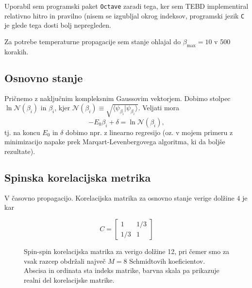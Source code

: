 \documentclass[12pt, a4 paper]{article}
\begin{document}
Uporabil sem programski paket \texttt{Octave} zaradi tega, ker sem TEBD implementiral relativno hitro in pravilno (nisem
se izgubljal okrog indeksov, programski jezik \texttt{C} je glede tega dosti bolj nepregleden.

Za potrebe temperaturne propagacije sem stanje ohlajal do $\beta_\text{max} = 10$ v 500 korakih.

\subsection{Osnovno stanje}

Pri\v cnemo z naklju\v cnim kompleksnim Gaussovim vektorjem. Dobimo stolpec $\ln\mathcal{N}(\beta_i)$ in $\beta_i$, kjer
$\mathcal{N}(\beta_i) \equiv \sqrt{\langle\psi_{\beta_i}|\psi_{\beta_i}\rangle}$. Veljati mora
\[
	-E_0\beta_i + \delta = \ln\mathcal{N}(\beta_i),
\]
tj. na koncu $E_0$ in $\delta$ dobimo npr. z linearno regresijo (oz. v mojem primeru z minimizacijo napake prek
Marqart-Levenbergovega algoritma, ki da bolj\v se rezultate).

\subsection{Spinska korelacijska metrika}

V \v casovno propagacijo. Korelacijska matrika za osnovno stanje verige dol\v zine $4$ je kar

\begin{equation}
	C = \begin{bmatrix} 1 & 1/3 \\ 1/3 & 1\end{bmatrix}
\end{equation}

\begin{figure}[H]\centering
	
	\caption{Spin-spin korelacijska matrika za verigo dol\v zine 12, pri \v cemer smo za vsak razcep obdr\v zali
		najve\v c $M = 8$ Schmidtovih koeficientov. Abscisa in ordinata sta indeks matrike, barvna skala
		pa prikazuje realni del korelacijske matrike.}
\end{figure}
\end{document}
